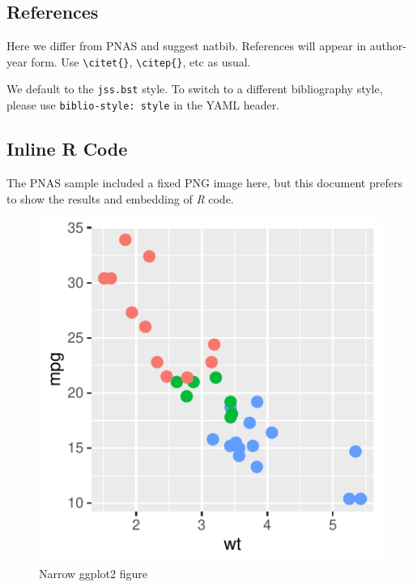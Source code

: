 \documentclass[letterpaper,9pt,twocolumn,twoside,]{pinp}
\begin{document}
\hypertarget{references}{%
\subsection{References}\label{references}}

Here we differ from PNAS and suggest natbib. References will appear in
author-year form. Use \texttt{\textbackslash{}citet\{\}},
\texttt{\textbackslash{}citep\{\}}, etc as usual.

We default to the \texttt{jss.bst} style. To switch to a different
bibliography style, please use \texttt{biblio-style:\ style} in the YAML
header.

\hypertarget{inline-r-code}{%
\subsection{Inline R Code}\label{inline-r-code}}

The PNAS sample included a fixed PNG image here, but this document
prefers to show the results and embedding of \emph{R} code.

\begin{Shaded}
\begin{Highlighting}[]
\OperatorTok{+}
\StringTok{    }\NormalTok{(}\NormalTok{, }\NormalTok{(}\OperatorTok{+}
\StringTok{    }\NormalTok{(}\NormalTok{)}
\end{Highlighting}
\end{Shaded}

\begin{figure}

{\centering \includegraphics{report_issaclee_files/figure-latex/figex-1} 

}

\caption{Narrow ggplot2 figure}\label{fig:figex}
\end{figure}
\end{document}
